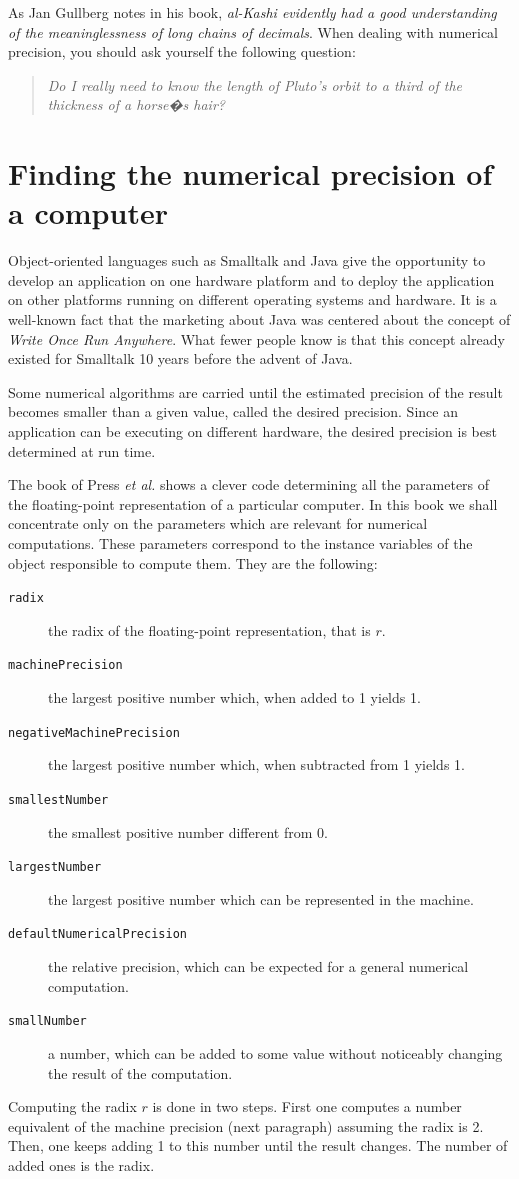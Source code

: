 \documentclass[twoside]{book}
\begin{document}
As Jan Gullberg notes in his book, {\it al-Kashi evidently had a
good understanding of the meaninglessness of long chains of
decimals}. When dealing with numerical precision, you should ask
yourself the following question:
\begin{quote}
{\sl Do I really need to know the length of Pluto's orbit to a
third of the thickness of a horse�s hair?}
\end{quote}

\section{Finding the numerical precision of a computer}
\label{sec:findprecision}
Object-oriented languages such as Smalltalk and Java give the
opportunity to develop an application on one hardware platform and
to deploy the application on other platforms running on different
operating systems and hardware. It is a well-known fact that the
marketing about Java was centered about the concept of {\sl Write
Once Run Anywhere}. What fewer people know is that this concept
already existed for Smalltalk 10 years before the advent of Java.

Some numerical algorithms are carried until the estimated
precision of the result becomes smaller than a given value, called
the desired precision. Since an application can be executing on
different hardware, the desired precision is best determined at
run time.

The book of Press {\it et al.} \cite{Press} shows a clever code
determining all the parameters of the floating-point
representation of a particular computer. In this book we shall
concentrate only on the parameters which are relevant for
numerical computations. These parameters correspond to the
instance variables of the object responsible to compute them. They
are the following:
\begin{description}
\item[{\tt radix}] the radix of the floating-point representation, that is $r$.
\item[{\tt machinePrecision}] the largest positive number which, when added to 1 yields 1.
\item[{\tt negativeMachinePrecision}] the largest positive number which, when subtracted from 1 yields 1.
\item[{\tt smallestNumber}] the smallest positive number different from 0.
\item[{\tt largestNumber}] the largest positive number which can be represented in the machine.
\item[{\tt defaultNumericalPrecision}] the relative precision, which can be expected for a general numerical computation.
\item[{\tt smallNumber}] a number, which can be added to some value without noticeably changing the result of the computation.
\end{description}
Computing the radix $r$ is done in two steps. First one computes a
number equivalent of the machine precision (\cf next paragraph)
assuming the radix is 2. Then, one keeps adding 1 to this number
until the result changes. The number of added ones is the radix.
\end{document}
